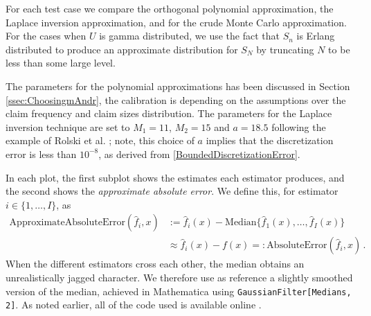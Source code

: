 For each test case we compare the orthogonal polynomial approximation, the Laplace inversion approximation, and for the crude Monte Carlo approximation. For the cases when $U$ is gamma distributed, we use the fact that $S_n$ is Erlang distributed to produce an approximate distribution for $S_N$ by truncating $N$ to be less than some large level. 


The parameters for the polynomial approximations has been discussed in Section \ref{ssec:ChoosingmAndr}, the calibration is depending on the assumptions over the claim frequency and claim sizes distribution.
The parameters for the Laplace inversion technique are set to $M_1=11$, $M_2=15$ and $a=18.5$ following the example of Rolski et al. \cite[Chapter 5, Section 5]{RoScScTe08}; note, this choice of $a$ implies that the discretization error is less than $10^{-8}$, as derived from \eqref{BoundedDiscretizationError}.


In each plot, the first subplot shows the estimates each estimator produces, and the second shows the \emph{approximate absolute error}. We define this, for estimator $i \in \{1,\dots,I\}$, as
\begin{align*}
\text{ApproximateAbsoluteError}( \widehat{f}_i, x ) 
&:= \widehat{f}_i(x)- \text{Median}\big\{ \widehat{f}_1(x),\dots,\widehat{f}_I(x) \big\} \\
&\approx \widehat{f}_i(x)-f(x) =: \text{AbsoluteError}( \widehat{f}_i, x ) \,.
\end{align*}
When the different estimators cross each other, the median obtains an unrealistically jagged character. We therefore use as reference a slightly smoothed version of the median, achieved in Mathematica using \texttt{GaussianFilter[Medians, 2]}. As noted earlier, all of the code used is available online \cite{StoplossCode}.


